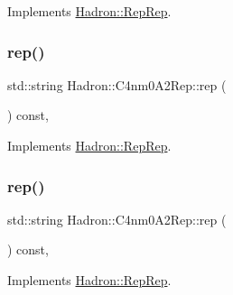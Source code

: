 Implements \mbox{\hyperlink{structHadron_1_1RepRep_ab3213025f6de249f7095892109575fde}{Hadron\+::\+Rep\+Rep}}.

\mbox{\label{structHadron_1_1C4nm0A2Rep_a33fdf55c4518f4e03005b1fc05271695}} 
\subsubsection{\texorpdfstring{rep()}{rep()}\hspace{0.1cm}{\footnotesize\ttfamily [3/5]}}
{\footnotesize\ttfamily std\+::string Hadron\+::\+C4nm0\+A2\+Rep\+::rep (\begin{DoxyParamCaption}{ }\end{DoxyParamCaption}) const\hspace{0.3cm}{\ttfamily [inline]}, {\ttfamily [virtual]}}



Implements \mbox{\hyperlink{structHadron_1_1RepRep_ab3213025f6de249f7095892109575fde}{Hadron\+::\+Rep\+Rep}}.

\mbox{\label{structHadron_1_1C4nm0A2Rep_a33fdf55c4518f4e03005b1fc05271695}} 
\subsubsection{\texorpdfstring{rep()}{rep()}\hspace{0.1cm}{\footnotesize\ttfamily [4/5]}}
{\footnotesize\ttfamily std\+::string Hadron\+::\+C4nm0\+A2\+Rep\+::rep (\begin{DoxyParamCaption}{ }\end{DoxyParamCaption}) const\hspace{0.3cm}{\ttfamily [inline]}, {\ttfamily [virtual]}}



Implements \mbox{\hyperlink{structHadron_1_1RepRep_ab3213025f6de249f7095892109575fde}{Hadron\+::\+Rep\+Rep}}.

\mbox{\label{structHadron_1_1C4nm0A2Rep_a33fdf55c4518f4e03005b1fc05271695}} 
